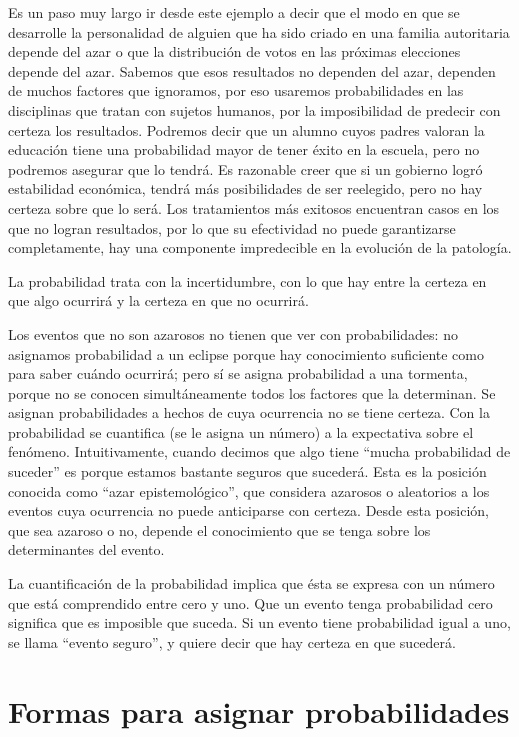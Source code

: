 \documentclass[]{book}
\begin{document}
Es un paso muy largo ir desde este ejemplo a decir que el modo en que se desarrolle la personalidad de alguien que ha sido criado en una familia autoritaria depende del azar o que la distribución de votos en las próximas elecciones depende del azar. Sabemos que esos resultados no dependen del azar, dependen de muchos factores que ignoramos, por eso usaremos probabilidades en las disciplinas que tratan con sujetos humanos, por la imposibilidad de predecir con certeza los resultados. Podremos decir que un alumno cuyos padres valoran la educación tiene una probabilidad mayor de tener éxito en la escuela, pero no podremos asegurar que lo tendrá. Es razonable creer que si un gobierno logró estabilidad económica, tendrá más posibilidades de ser reelegido, pero no hay certeza sobre que lo será. Los tratamientos más exitosos encuentran casos en los que no logran resultados, por lo que su efectividad no puede garantizarse completamente, hay una componente impredecible en la evolución de la patología.

La probabilidad trata con la incertidumbre, con lo que hay entre la
certeza en que algo ocurrirá y la certeza en que no ocurrirá.

Los eventos que no son azarosos no tienen que ver con probabilidades: no
asignamos probabilidad a un eclipse porque hay conocimiento suficiente
como para saber cuándo ocurrirá; pero sí se asigna probabilidad a una
tormenta, porque no se conocen simultáneamente todos los factores que la
determinan. Se asignan probabilidades a hechos de cuya ocurrencia no se
tiene certeza. Con la probabilidad se cuantifica (se le asigna un
número) a la expectativa sobre el fenómeno. Intuitivamente, cuando
decimos que algo tiene ``mucha probabilidad de suceder'' es porque estamos
bastante seguros que sucederá. Esta es la posición conocida como ``azar
epistemológico'', que considera azarosos o aleatorios a los eventos cuya
ocurrencia no puede anticiparse con certeza. Desde esta posición, que
sea azaroso o no, depende el conocimiento que se tenga sobre los
determinantes del evento.

La cuantificación de la probabilidad implica que ésta se expresa con un
número que está comprendido entre cero y uno. Que un evento tenga
probabilidad cero significa que es imposible que suceda. Si un evento
tiene probabilidad igual a uno, se llama ``evento seguro'', y quiere decir
que hay certeza en que sucederá.

\hypertarget{formas-para-asignar-probabilidades}{%
\section{Formas para asignar probabilidades}\label{formas-para-asignar-probabilidades}}
\end{document}
